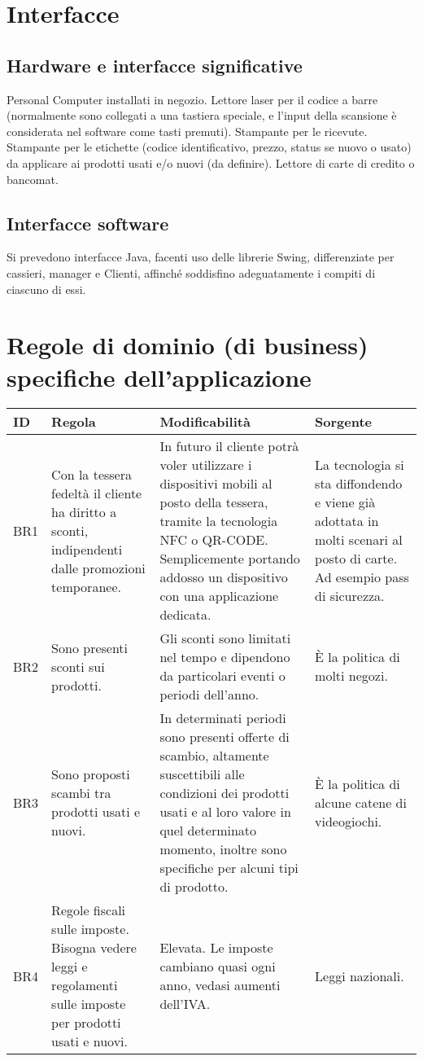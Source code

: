 \documentclass[a4paper,10pt]{report}
\begin{document}
 \section*{Interfacce}
 \subsection*{Hardware e interfacce significative}
Personal Computer installati in negozio.
Lettore laser per il codice a barre (normalmente sono collegati a una tastiera speciale, e l’input della scansione è considerata nel software come tasti premuti).
Stampante per le ricevute.
Stampante per le etichette (codice identificativo, prezzo, status se nuovo o usato) da applicare ai prodotti usati e/o nuovi (da definire).
Lettore di carte di credito o bancomat.

 \subsection*{Interfacce software}
Si prevedono interfacce Java, facenti uso delle librerie Swing, differenziate per cassieri, manager e Clienti, affinché soddisfino adeguatamente i compiti di ciascuno di essi.
 
 \section*{Regole di dominio (di business) specifiche dell'applicazione}
 \begin{tabular}{|p{}|p{}|p{}|p{}|}
 \hline
  \textbf{ID} & \textbf{Regola} & \textbf{Modificabilità} & \textbf{Sorgente} \\
  \hline
  BR1 &
  Con la tessera fedeltà il cliente ha diritto a sconti, indipendenti dalle promozioni temporanee. &
  In futuro il cliente potrà voler utilizzare i dispositivi mobili al posto della tessera, tramite la tecnologia NFC o QR-CODE. Semplicemente portando addosso un dispositivo con una applicazione dedicata. &
  La tecnologia si sta diffondendo e viene già adottata in molti scenari al posto di carte. Ad esempio pass di sicurezza.\\
  \hline
  BR2 & 
  Sono presenti sconti sui prodotti. &
  Gli sconti sono limitati nel tempo e dipendono da particolari eventi o periodi dell'anno. &
  È la politica di molti negozi.\\
  \hline
  BR3 &
  Sono proposti scambi tra prodotti usati e nuovi. &
  In determinati periodi sono presenti offerte di scambio, altamente suscettibili alle condizioni dei prodotti usati e al loro valore in quel determinato momento, inoltre sono specifiche per alcuni tipi di prodotto. &
  È la politica di alcune catene di videogiochi. \\
  \hline
  BR4 &
  Regole fiscali sulle imposte. Bisogna vedere leggi e regolamenti sulle imposte per prodotti usati e nuovi. &
  Elevata. Le imposte cambiano quasi ogni anno, vedasi aumenti dell'IVA. &
  Leggi nazionali.\\
  \hline
 \end{tabular}
\end{document}
